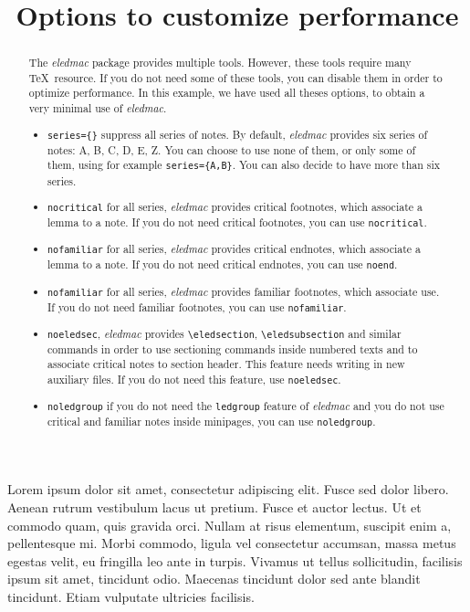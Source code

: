 \documentclass{article}
\begin{document}
\begin{english}
\title{Options to customize performance}
\maketitle
\begin{abstract}
The \emph{eledmac} package provides multiple tools. However, these tools require many \TeX\ resource. If you do not need some of these tools, you can disable them in order to optimize performance.
In this example, we have used all theses options, to obtain a very minimal use of \emph{eledmac}.
\begin{itemize}
\item\verb+series={}+ suppress all series of notes. By default, \emph{eledmac} provides six series of notes: A, B, C, D, E, Z. You can choose to use none of them, or only some of them, using for example \verb+series={A,B}+. You can also decide to have more than six series.
\item\verb+nocritical+ for all series, \emph{eledmac} provides critical footnotes, which associate a lemma to a note. If you do not need critical footnotes, you can use \verb+nocritical+.
\item\verb+nofamiliar+ for all series, \emph{eledmac} provides critical endnotes, which associate a lemma to a note. If you do not need critical endnotes, you can use \verb+noend+.
\item\verb+nofamiliar+ for all series, \emph{eledmac} provides familiar footnotes, which associate use. If you do not need familiar footnotes, you can use \verb+nofamiliar+.
\item\verb+noeledsec+, \emph{eledmac} provides \verb+\eledsection+, \verb+\eledsubsection+ and similar commands in order to use sectioning commands inside numbered texts and to associate critical notes to section header. This feature needs writing in new auxiliary files. If you do not need this feature, use \verb+noeledsec+.
\item\verb+noledgroup+ if you do not need the \verb+ledgroup+ feature of \emph{eledmac} and you do not use critical and familiar notes inside minipages, you can use \verb+noledgroup+.
\end{itemize}
\end{abstract}
\end{english}
\beginnumbering
\pstart
Lorem ipsum dolor sit amet, consectetur adipiscing elit. Fusce sed dolor libero. Aenean rutrum vestibulum lacus ut pretium. Fusce et auctor lectus. Ut et commodo quam, quis gravida orci. Nullam at risus elementum, suscipit enim a, pellentesque mi. Morbi commodo, ligula vel consectetur accumsan, massa metus egestas velit, eu fringilla leo ante in turpis. Vivamus ut tellus sollicitudin, facilisis ipsum sit amet, tincidunt odio. Maecenas tincidunt dolor sed ante blandit tincidunt. Etiam vulputate ultricies facilisis.
\pend
\endnumbering
\end{document}

